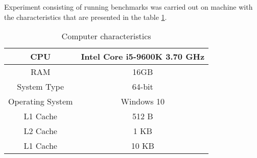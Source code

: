 Experiment consisting of running benchmarks was carried out on machine
with the characteristics that are presented in the table \ref{table:1}.
\begin{table}[ht!]
    \centering
    \begin{tabular}{|c|c|}
        \hline
        CPU & Intel Core i5-9600K 3.70 GHz\\
        \hline
        RAM & 16GB \\
        \hline
        System Type & 64-bit\\
        \hline
        Operating System & Windows 10\\
        \hline
        L1 Cache & 512 B\\
        \hline
        L2 Cache & 1 KB\\
        \hline
        L1 Cache & 10 KB\\
        \hline
    \end{tabular}
    \caption{Computer characteristics}
    \label{table:1}
\end{table}
